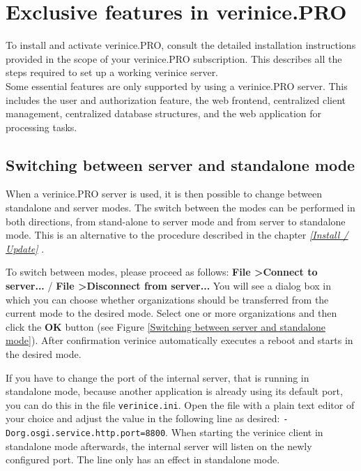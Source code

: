 \documentclass[a4paper,10pt]{book}
\begin{document}
\chapter{Exclusive features in verinice.PRO}
To install and activate verinice.PRO, consult the detailed installation instructions provided in
the scope of your verinice.PRO subscription. This describes all the steps required to set up a working verinice server.
\newline\\
Some essential features are only supported by using a verinice.PRO server. This includes the user and authorization
feature, the web frontend, centralized client management, centralized database structures, and the web application
for processing tasks.

\section{Switching between server and standalone mode}\label{sec:switching-between-server-and-standalone-mode}
When a verinice.\textsc{PRO} server is used, it is then possible to change between standalone and server modes.
The switch between the modes can be performed in both directions, from stand-alone to server mode and from server to standalone mode. This is an alternative to the procedure described in the chapter {\em \ref{Install / Update} }.

To switch between modes, please proceed as follows: \textbf{File \textgreater Connect to server...} / \textbf{File \textgreater Disconnect from server...}
You will see a dialog box in which you can choose whether organizations should be transferred from the current mode to the desired mode.
Select one or more organizations and then click the \textbf{OK} button (see Figure \ref{Switching between server and standalone mode}).
After confirmation verinice automatically executes a reboot and starts in the desired mode.

If you have to change the port of the internal server, that is running
in standalone mode, because another application is already using its
default port, you can do this in the file \texttt{verinice.ini}. Open
the file with a plain text editor of your choice and adjust the value
in the following line as desired:
\texttt{-Dorg.osgi.service.http.port=8800}. When starting the verinice
client in standalone mode afterwards, the internal server will listen
on the newly configured port. The line only has an effect in
standalone mode.
\end{document}
